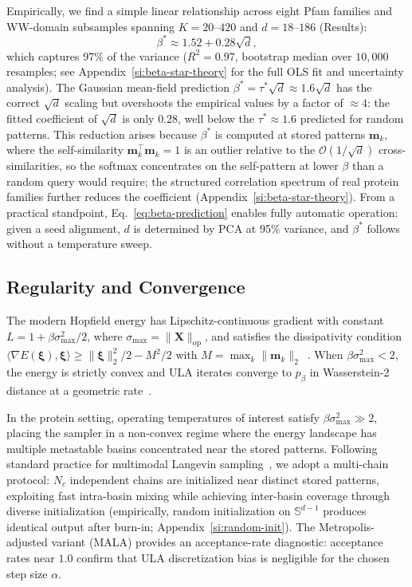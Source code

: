 Empirically, we find a simple linear relationship across eight Pfam families and WW-domain subsamples spanning $K = 20$--$420$ and $d = 18$--$186$ (Results):
\begin{equation}\label{eq:beta-prediction}
    \beta^* \approx 1.52 + 0.28\sqrt{d},
\end{equation}
which captures 97\% of the variance ($R^2 = 0.97$, bootstrap median over $10{,}000$ resamples; see Appendix~\ref{si:beta-star-theory} for the full OLS fit and uncertainty analysis). The Gaussian mean-field prediction $\beta^* = \tau^*\sqrt{d} \approx 1.6\sqrt{d}$ has the correct $\sqrt{d}$ scaling but overshoots the empirical values by a factor of $\approx 4$: the fitted coefficient of $\sqrt{d}$ is only $0.28$, well below the $\tau^* \approx 1.6$ predicted for random patterns. This reduction arises because $\beta^*$ is computed at stored patterns $\mathbf{m}_k$, where the self-similarity $\mathbf{m}_k^\top\mathbf{m}_k = 1$ is an outlier relative to the $\mathcal{O}(1/\sqrt{d})$ cross-similarities, so the softmax concentrates on the self-pattern at lower $\beta$ than a random query would require; the structured correlation spectrum of real protein families further reduces the coefficient (Appendix~\ref{si:beta-star-theory}). From a practical standpoint, Eq.~\eqref{eq:beta-prediction} enables fully automatic operation: given a seed alignment, $d$ is determined by PCA at 95\% variance, and $\beta^*$ follows without a temperature sweep.

\subsection{Regularity and Convergence}\label{sec:convergence}
The modern Hopfield energy has Lipschitz-continuous gradient with constant $L = 1 + \beta\sigma_{\max}^2/2$, where $\sigma_{\max} = \|\mathbf{X}\|_{\mathrm{op}}$, and satisfies the dissipativity condition $\langle \nabla E(\boldsymbol{\xi}), \boldsymbol{\xi} \rangle \geq \|\boldsymbol{\xi}\|_2^2/2 - M^2/2$ with $M = \max_k \|\mathbf{m}_k\|_2$~\cite{alswaidanVarnerStochasticAttention2026}. When $\beta\sigma_{\max}^2 < 2$, the energy is strictly convex and ULA iterates converge to $p_\beta$ in Wasserstein-2 distance at a geometric rate~\cite{dalalyanTheoreticalGuaranteesApproximate2017,durmusNonasymptoticAnalysisUnadjusted2017}.

In the protein setting, operating temperatures of interest satisfy $\beta\sigma_{\max}^2 \gg 2$, placing the sampler in a non-convex regime where the energy landscape has multiple metastable basins concentrated near the stored patterns. Following standard practice for multimodal Langevin sampling~\cite{bovier2004metastability}, we adopt a multi-chain protocol: $N_c$ independent chains are initialized near distinct stored patterns, exploiting fast intra-basin mixing while achieving inter-basin coverage through diverse initialization (empirically, random initialization on $\mathbb{S}^{d-1}$ produces identical output after burn-in; Appendix~\ref{si:random-init}). The Metropolis-adjusted variant (MALA) provides an acceptance-rate diagnostic: acceptance rates near $1.0$ confirm that ULA discretization bias is negligible for the chosen step size $\alpha$.

